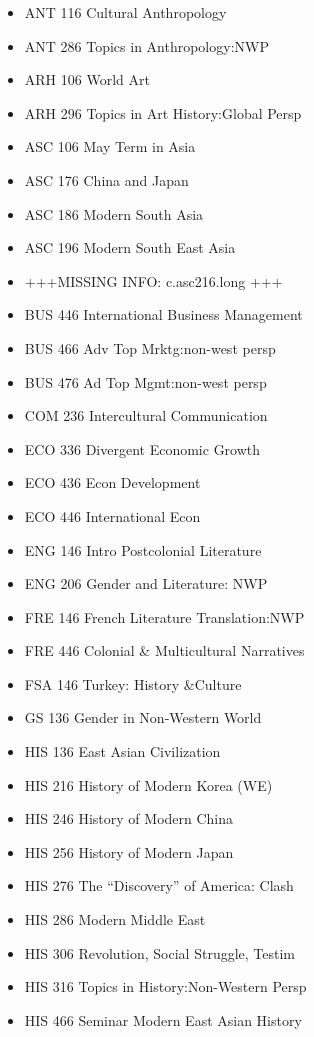 \documentclass[
  letterpaper,
]{scrbook}
\providecommand{\tightlist}{%
  \setlength{\itemsep}{0pt}\setlength{\parskip}{0pt}}
\begin{document}
\begin{itemize}
\tightlist
\item
  ANT 116 Cultural Anthropology
\item
  ANT 286 Topics in Anthropology:NWP
\item
  ARH 106 World Art
\item
  ARH 296 Topics in Art History:Global Persp
\item
  ASC 106 May Term in Asia
\item
  ASC 176 China and Japan
\item
  ASC 186 Modern South Asia
\item
  ASC 196 Modern South East Asia
\item
  +++MISSING INFO: c.asc216.long +++
\item
  BUS 446 International Business Management
\item
  BUS 466 Adv Top Mrktg:non-west persp
\item
  BUS 476 Ad Top Mgmt:non-west persp
\item
  COM 236 Intercultural Communication
\item
  ECO 336 Divergent Economic Growth
\item
  ECO 436 Econ Development
\item
  ECO 446 International Econ
\item
  ENG 146 Intro Postcolonial Literature
\item
  ENG 206 Gender and Literature: NWP
\item
  FRE 146 French Literature Translation:NWP
\item
  FRE 446 Colonial \& Multicultural Narratives
\item
  FSA 146 Turkey: History \&Culture
\item
  GS 136 Gender in Non-Western World
\item
  HIS 136 East Asian Civilization
\item
  HIS 216 History of Modern Korea (WE)
\item
  HIS 246 History of Modern China
\item
  HIS 256 History of Modern Japan
\item
  HIS 276 The ``Discovery'' of America: Clash
\item
  HIS 286 Modern Middle East
\item
  HIS 306 Revolution, Social Struggle, Testim
\item
  HIS 316 Topics in History:Non-Western Persp
\item
  HIS 466 Seminar Modern East Asian History

\end{itemize}
\end{document}
